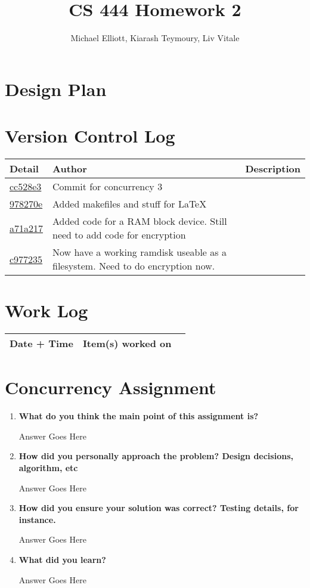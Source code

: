 \documentclass[letterpaper,10pt,titlepage,draftclsnofoot,onecolumn]{IEEEtran}
\title{CS 444 Homework 2}
\author{Michael Elliott, Kiarash Teymoury, Liv Vitale}
\begin{document}
\section{Design Plan}


\section{Version Control Log}

\begin{tabular}{l l l}\textbf{Detail} & \textbf{Author} & \textbf{Description}\\\hline
\href{https://github.com/elliomic/CS-444/commit/cc528e366648a00c65aba64a9f1f2ba0f2559acb}{cc528e3} & Commit for concurrency 3\\\hline
\href{https://github.com/elliomic/CS-444/commit/978270e33710eee398a8e62dc35cba54fb573f49}{978270e} & Added makefiles and stuff for LaTeX\\\hline
\href{https://github.com/elliomic/CS-444/commit/a71a21724fcc71dec65b67e55cf5452a8fbcd1cc}{a71a217} & Added code for a RAM block device. Still need to add code for encryption\\\hline
\href{https://github.com/elliomic/CS-444/commit/c977235b57d99b5232287fd15100ed4ce500282a}{c977235} & Now have a working ramdisk useable as a filesystem. Need to do encryption now.\\\hline
\hline\end{tabular}


\section{Work Log}
\begin{tabular}{l | c | r}
Date + Time & Item(s) worked on \\
\hline

\end{tabular}


\section{Concurrency Assignment}
\begin{enumerate}
\item \textbf{What do you think the main point of this assignment is?}

Answer Goes Here\par

\item \textbf{How did you personally approach the problem? Design decisions, algorithm, etc}

Answer Goes Here\par

\item \textbf{How did you ensure your solution was correct? Testing details, for instance.}

Answer Goes Here\par

\item \textbf{What did you learn?}

Answer Goes Here\par

\end{enumerate}

\nocite{*}



\end{document}
